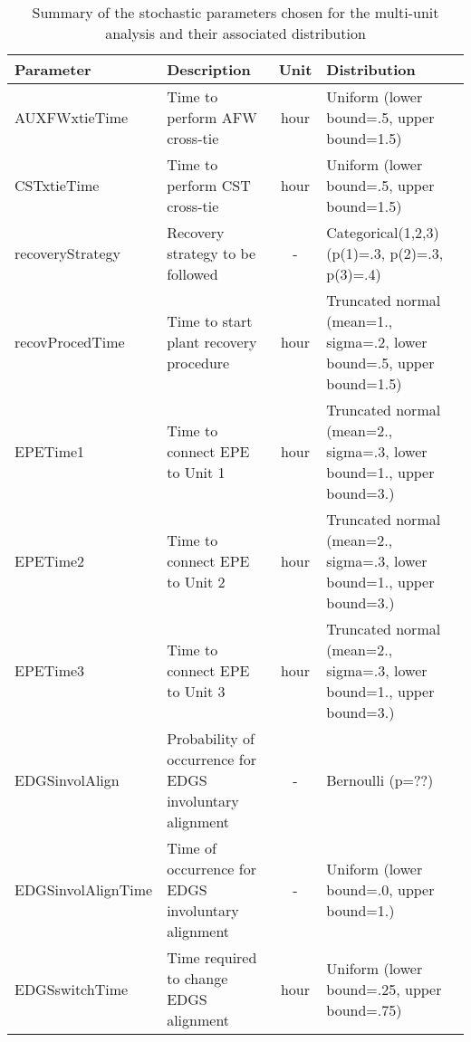 \begin{table}
  \centering
  \begin{center}
      \begin{tabular}{ | l | p{5cm} | c | p{5cm} |}
        \hline
         \textbf{Parameter}          & \textbf{Description}                      & \textbf{Unit}   & \textbf{Distribution}                                         \\ \hline \hline
         AUXFWxtieTime      & Time to perform AFW cross-tie    & hour   & Uniform (lower bound=.5, upper bound=1.5)            \\ \hline
         CSTxtieTime        & Time to perform CST cross-tie    & hour   & Uniform (lower bound=.5, upper bound=1.5)            \\ \hline
         recoveryStrategy   & Recovery strategy to be followed & -      & Categorical(1,2,3) (p(1)=.3, p(2)=.3, p(3)=.4)       \\ \hline
         recovProcedTime    & Time to start plant recovery procedure    & hour        & Truncated normal (mean=1., sigma=.2, lower bound=.5, upper bound=1.5)       \\ \hline
         EPETime1           & Time to connect EPE to Unit 1    & hour   & Truncated normal (mean=2., sigma=.3, lower bound=1., upper bound=3.)   \\ \hline
         EPETime2           & Time to connect EPE to Unit 2    & hour   & Truncated normal (mean=2., sigma=.3, lower bound=1., upper bound=3.)   \\ \hline
         EPETime3           & Time to connect EPE to Unit 3    & hour   & Truncated normal (mean=2., sigma=.3, lower bound=1., upper bound=3.)   \\ \hline
         EDGSinvolAlign     & Probability of occurrence for EDGS involuntary alignment & -      & Bernoulli (p=??)                               \\ \hline
         EDGSinvolAlignTime & Time of occurrence for EDGS involuntary alignment        & -      & Uniform (lower bound=.0, upper bound=1.)       \\ \hline
         EDGSswitchTime     & Time required to change EDGS alignment       & hour  & Uniform (lower bound=.25, upper bound=.75)                  \\ 
        \hline
      \end{tabular}
  \end{center}
  \caption{Summary of the stochastic parameters chosen for the multi-unit analysis and their associated distribution}
  \label{tab:stochasticParameters1}
\end{table}

